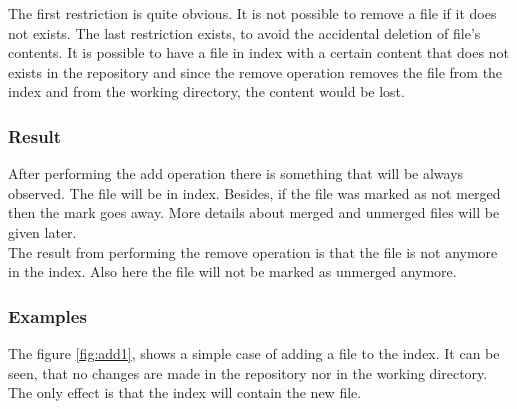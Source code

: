 The first restriction is quite obvious. It is not possible to remove
a file if it does not exists. The last restriction exists, to avoid
the accidental deletion of file's contents. It is possible to have a
file in index with a certain content that does not exists in the
repository and since the remove operation removes the file from the index
and from the working directory, the content would be lost.  

\subsubsection{Result}
After performing the add operation there is something that will be
always observed. The file will be in index. Besides, if the file was
marked as not merged then the mark goes away. More details about
merged and unmerged files will be given later.\\

The result from performing the remove operation is that the file is
not anymore in the index. Also here the file will not be marked as
unmerged anymore.

\subsubsection{Examples}

The figure \ref{fig:add1}, shows a simple case of adding a file to the 
index. It can be seen, that no changes are made in the repository nor in the working
directory. The only effect is that the index will contain the new
file.\\

